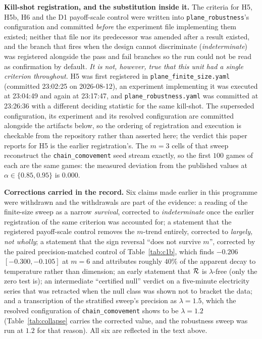 \noindent\textbf{Kill-shot registration, and the substitution inside it.} The criteria for
H5, H5b, H6 and the D1 payoff-scale control were written into \texttt{plane\_robustness}'s
configuration and committed \emph{before} the experiment file implementing them existed;
neither that file nor its predecessor was amended after a result existed, and the branch that
fires when the design cannot discriminate (\emph{indeterminate}) was registered alongside the
pass and fail branches so the run could not be read as confirmation by default. \emph{It is
not, however, true that this unit had a single criterion throughout.} H5 was first registered
in \texttt{plane\_finite\_size.yaml} (committed 23:02:25 on 2026-08-12), an experiment
implementing it was executed at 23:04:49 and again at 23:17:47, and
\texttt{plane\_robustness.yaml} was committed at 23:26:36 with a different deciding statistic
for the same kill-shot. The superseded configuration, its experiment and its resolved
configuration are committed alongside the artifacts below, so the ordering of registration
and execution is checkable from the repository rather than asserted here; the verdict this
paper reports for H5 is the earlier registration's. The $m=3$ cells of that sweep reconstruct the
\texttt{chain\_comovement} seed stream exactly, so the first $100$ games of each are the
same games: the measured deviation from the published values at $\alpha\in\{0.85,0.95\}$ is
$0.000$.

\noindent\textbf{Corrections carried in the record.} Six claims made earlier in this
programme were withdrawn and the withdrawals are part of the evidence: a reading of the
finite-size sweep as a narrow \emph{survival}, corrected to \emph{indeterminate} once the
earlier registration of the same criterion was accounted for; a statement that the registered
payoff-scale control removes the $m$-trend entirely, corrected to \emph{largely, not wholly};
a statement that the sign reversal ``does not survive $m$'', corrected by the paired
precision-matched control of Table~\ref{tab:c1b}, which finds $-0.206$ $[-0.300,-0.105]$ at
$m=6$ and attributes roughly $40\%$ of the apparent decay to temperature rather than
dimension; an early statement that $\mathcal{R}$ is $\lambda$-free (only the zero test is); an
intermediate ``certified null'' verdict on a five-minute electricity series that was
retracted when the null class was shown not to bracket the data; and a transcription of the
stratified sweep's precision as $\lambda=1.5$, which the resolved configuration of
\texttt{chain\_comovement} shows to be $\lambda=1.2$ (Table~\ref{tab:collapse} carries the
corrected value, and the robustness sweep was run at $1.2$ for that reason). All six are
reflected in the text above.

